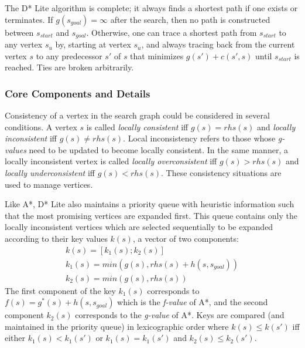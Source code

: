 \documentclass[10pt,journal]{IEEEtran}
\begin{document}

The D* Lite algorithm is complete; it always finds a shortest path if one exists or terminates. If $g(s_{goal}) = \infty$ after the search, then no path is constructed between $s_{start}$ and $s_{goal}$. Otherwise, one can trace a shortest path from $s_{start}$ to any vertex $s_{u}$ by, starting at vertex $s_{u}$, and always tracing back from the current vertex $s$ to any predecessor $s'$ of $s$ that minimizes $g(s') + c(s', s)$ until $s_{start}$ is reached. Ties are broken arbitrarily.

\subsubsection{Core Components and Details}

Consistency of a vertex in the search graph could be considered in several conditions. A vertex $s$ is called \textit{locally consistent} iff $g(s) = rhs(s)$ and \textit{locally inconsistent} iff $g(s) \neq rhs(s)$. Local inconsistency refers to those whose \textit{g-values} need to be updated to become locally consistent. In the same manner, a locally inconsistent vertex is called \textit{locally overconsistent} iff $g(s) > rhs(s)$ and \textit{locally underconsistent} iff $g(s) < rhs(s)$. These consistency situations are used to manage vertices.

Like A*, D* Lite also maintains a priority queue with heuristic information such that the most promising vertices are expanded first. This queue contains only the locally inconsistent vertices which are selected sequentially to be expanded according to their key values $k(s)$, a vector of two components:
\begin{gather*}
k(s) = [k_{1}(s); k_{2}(s)] \\
k_{1}(s) = min(g(s), rhs(s) + h(s, s_{goal})) \\
k_{2}(s) = min(g(s), rhs(s))
\end{gather*}
The first component of the key $k_{1}(s)$ corresponds to $f(s) = g^*(s) + h(s, s_{goal})$ which is the \textit{f-value} of A*, and the second component $k_{2}(s)$ corresponds to the \textit{g-value} of A*. Keys are compared (and maintained in the priority queue) in lexicographic order where $k(s) \leq k(s')$ iff either $k_{1}(s) < k_{1}(s')$ or $k_{1}(s) = k_{1}(s')$ and $k_{2}(s) \leq k_{2}(s')$.
\end{document}
